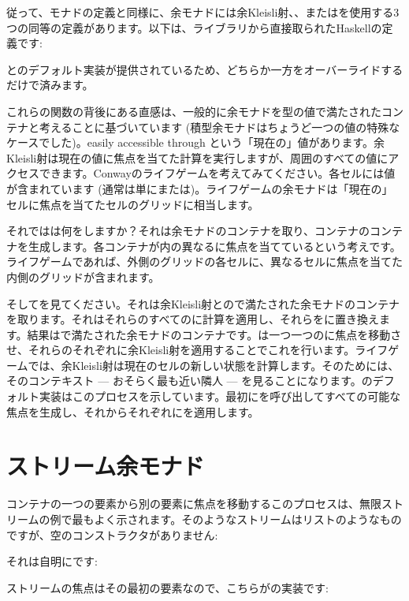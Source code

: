 従って、モナドの定義と同様に、余モナドには余Kleisli射、、またはを使用する3つの同等の定義があります。以下は、ライブラリから直接取られたHaskellの定義です: 

とのデフォルト実装が提供されているため、どちらか一方をオーバーライドするだけで済みます。

これらの関数の背後にある直感は、一般的に余モナドを型の値で満たされたコンテナと考えることに基づいています (積型余モナドはちょうど一つの値の特殊なケースでした)。easily accessible through という「現在の」値があります。余Kleisli射は現在の値に焦点を当てた計算を実行しますが、周囲のすべての値にアクセスできます。Conwayのライフゲームを考えてみてください。各セルには値が含まれています (通常は単にまたは)。ライフゲームの余モナドは「現在の」セルに焦点を当てたセルのグリッドに相当します。

それではは何をしますか？それは余モナドのコンテナを取り、コンテナのコンテナを生成します。各コンテナが内の異なるに焦点を当てているという考えです。ライフゲームであれば、外側のグリッドの各セルに、異なるセルに焦点を当てた内側のグリッドが含まれます。

そしてを見てください。それは余Kleisli射とので満たされた余モナドのコンテナを取ります。それはそれらのすべてのに計算を適用し、それらをに置き換えます。結果はで満たされた余モナドのコンテナです。は一つ一つのに焦点を移動させ、それらのそれぞれに余Kleisli射を適用することでこれを行います。ライフゲームでは、余Kleisli射は現在のセルの新しい状態を計算します。そのためには、そのコンテキスト --- おそらく最も近い隣人 --- を見ることになります。のデフォルト実装はこのプロセスを示しています。最初にを呼び出してすべての可能な焦点を生成し、それからそれぞれにを適用します。

\section{ストリーム余モナド}

コンテナの一つの要素から別の要素に焦点を移動するこのプロセスは、無限ストリームの例で最もよく示されます。そのようなストリームはリストのようなものですが、空のコンストラクタがありません: 

それは自明にです: 

ストリームの焦点はその最初の要素なので、こちらがの実装です: 

